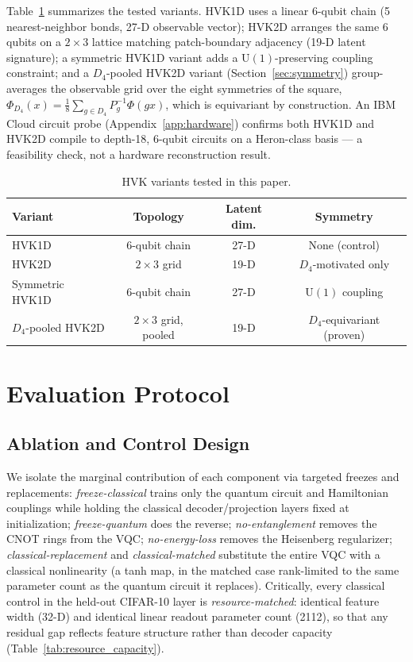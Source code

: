 \documentclass[journal]{IEEEtran}
\begin{document}
Table~\ref{tab:variants} summarizes the tested variants. HVK1D uses a linear 6-qubit chain (5 nearest-neighbor bonds, 27-D observable vector); HVK2D arranges the same 6 qubits on a $2\times3$ lattice matching patch-boundary adjacency (19-D latent signature); a symmetric HVK1D variant adds a $\mathrm{U}(1)$-preserving coupling constraint; and a $D_4$-pooled HVK2D variant (Section~\ref{sec:symmetry}) group-averages the observable grid over the eight symmetries of the square, $\Phi_{D_4}(x)=\frac{1}{8}\sum_{g\in D_4}P_g^{-1}\Phi(gx)$, which is equivariant by construction. An IBM Cloud circuit probe (Appendix~\ref{app:hardware}) confirms both HVK1D and HVK2D compile to depth-18, 6-qubit circuits on a Heron-class basis --- a feasibility check, not a hardware reconstruction result.

\begin{table}[t]
\centering
\caption{HVK variants tested in this paper.}
\label{tab:variants}
\scriptsize
\begin{tabular}{lccc}
\toprule
Variant & Topology & Latent dim. & Symmetry \\
\midrule
HVK1D & 6-qubit chain & 27-D & None (control) \\
HVK2D & $2\times3$ grid & 19-D & $D_4$-motivated only \\
Symmetric HVK1D & 6-qubit chain & 27-D & $\mathrm{U}(1)$ coupling \\
$D_4$-pooled HVK2D & $2\times3$ grid, pooled & 19-D & $D_4$-equivariant (proven) \\
\bottomrule
\end{tabular}
\end{table}

\section{Evaluation Protocol}
\label{sec:protocol}
\subsection{Ablation and Control Design}
We isolate the marginal contribution of each component via targeted freezes and replacements: \emph{freeze-classical} trains only the quantum circuit and Hamiltonian couplings while holding the classical decoder/projection layers fixed at initialization; \emph{freeze-quantum} does the reverse; \emph{no-entanglement} removes the CNOT rings from the VQC; \emph{no-energy-loss} removes the Heisenberg regularizer; \emph{classical-replacement} and \emph{classical-matched} substitute the entire VQC with a classical nonlinearity (a tanh map, in the matched case rank-limited to the same parameter count as the quantum circuit it replaces). Critically, every classical control in the held-out CIFAR-10 layer is \emph{resource-matched}: identical feature width (32-D) and identical linear readout parameter count (2112), so that any residual gap reflects feature structure rather than decoder capacity (Table~\ref{tab:resource_capacity}).
\end{document}
